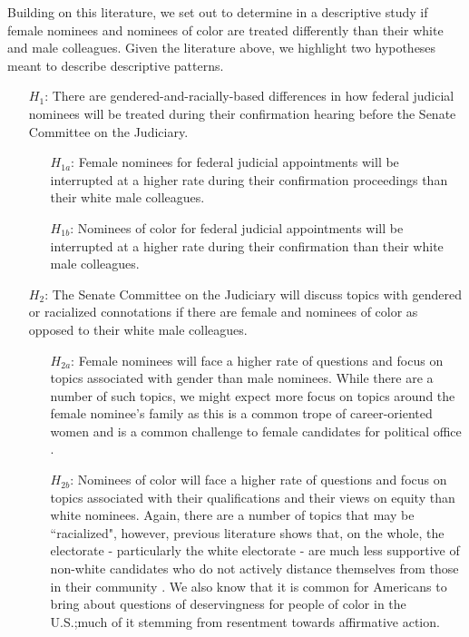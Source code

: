 \documentclass [12pt]{article}
\begin{document}
Building on this literature, we set out to determine in a descriptive study if female nominees and nominees of color are treated differently than their white and male colleagues. Given the literature above, we highlight two hypotheses meant to describe descriptive patterns.

\begin{itemize}
\item[\textit{$H_1$}:] There are gendered-and-racially-based differences in how federal judicial nominees will be treated during their confirmation hearing before the Senate Committee on the Judiciary.
\begin{itemize}
    \item[\textit{$H_{1a}$}:] Female nominees for federal judicial appointments will be interrupted at a higher rate during their confirmation proceedings than their white male colleagues. 
    \item[\textit{$H_{1b}$}:] Nominees of color for federal judicial appointments will be interrupted at a higher rate during their confirmation than their white male colleagues.
\end{itemize}

\item[\textit{$H_2$}:] The Senate Committee on the Judiciary will discuss topics with gendered or racialized connotations if there are female and nominees of color as opposed to their white male colleagues. 
\begin{itemize}
    \item[\textit{$H_{2a}$}:] Female nominees will face a higher rate of questions and focus on topics associated with gender than male nominees. While there are a number of such topics, we might expect more focus on topics around the female nominee's family as this is a common trope of career-oriented women and is a common challenge to female candidates for political office \citep[see][]{sanbonmatsu_dolan_2009}.
    \item[\textit{$H_{2b}$}:] Nominees of color will face a higher rate of questions and focus on topics associated with their qualifications and their views on equity than white nominees. Again, there are a number of topics that may be ``racialized", however, previous literature shows that, on the whole, the electorate - particularly the white electorate - are much less supportive of non-white candidates who do not actively distance themselves from those in their community \citep{stephens-dougan_2020}. We also know that it is common for Americans to bring about questions of deservingness for people of color in the U.S.\citep{gilens_1999};much of it stemming from resentment towards affirmative action.
\end{itemize}
\end{itemize}	
\end{document}
